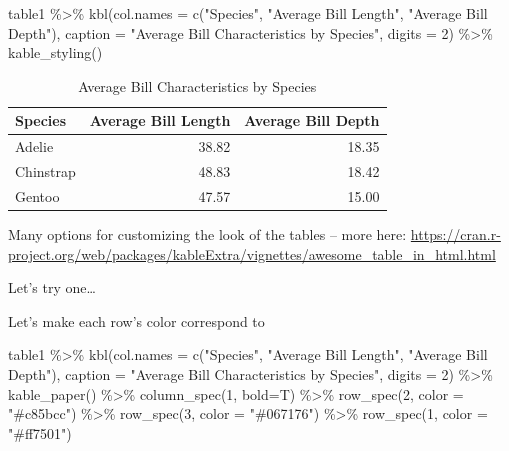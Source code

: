 \documentclass[
  letterpaper,
  DIV=11,
  numbers=noendperiod]{scrartcl}
\newenvironment{Shaded}{\begin{snugshade}}{\end{snugshade}}
\newcommand{\AttributeTok}[1]{\textcolor[rgb]{0.40,0.45,0.13}{#1}}
\newcommand{\DecValTok}[1]{\textcolor[rgb]{0.68,0.00,0.00}{#1}}
\newcommand{\FunctionTok}[1]{\textcolor[rgb]{0.28,0.35,0.67}{#1}}
\newcommand{\NormalTok}[1]{\textcolor[rgb]{0.00,0.23,0.31}{#1}}
\newcommand{\SpecialCharTok}[1]{\textcolor[rgb]{0.37,0.37,0.37}{#1}}
\newcommand{\StringTok}[1]{\textcolor[rgb]{0.13,0.47,0.30}{#1}}
\begin{document}
\begin{Shaded}
\begin{Highlighting}[]
\NormalTok{table1 }\SpecialCharTok{\%\textgreater{}\%}
  \FunctionTok{kbl}\NormalTok{(}\AttributeTok{col.names =} \FunctionTok{c}\NormalTok{(}\StringTok{"Species"}\NormalTok{, }\StringTok{"Average Bill Length"}\NormalTok{, }\StringTok{"Average Bill Depth"}\NormalTok{), }
    \AttributeTok{caption =} \StringTok{"Average Bill Characteristics by Species"}\NormalTok{, }
    \AttributeTok{digits =} \DecValTok{2}\NormalTok{) }\SpecialCharTok{\%\textgreater{}\%}
  \FunctionTok{kable\_styling}\NormalTok{()}
\end{Highlighting}
\end{Shaded}

\begin{table}
\centering
\caption{Average Bill Characteristics by Species}
\centering
\begin{tabular}[t]{l|r|r}
\hline
Species & Average Bill Length & Average Bill Depth\\
\hline
Adelie & 38.82 & 18.35\\
\hline
Chinstrap & 48.83 & 18.42\\
\hline
Gentoo & 47.57 & 15.00\\
\hline
\end{tabular}
\end{table}

Many options for customizing the look of the tables -- more here:
\url{https://cran.r-project.org/web/packages/kableExtra/vignettes/awesome_table_in_html.html}

Let's try one\ldots{}

Let's make each row's color correspond to

\begin{Shaded}
\begin{Highlighting}[]
\NormalTok{table1 }\SpecialCharTok{\%\textgreater{}\%}
  \FunctionTok{kbl}\NormalTok{(}\AttributeTok{col.names =} \FunctionTok{c}\NormalTok{(}\StringTok{"Species"}\NormalTok{, }\StringTok{"Average Bill Length"}\NormalTok{, }\StringTok{"Average Bill Depth"}\NormalTok{), }
    \AttributeTok{caption =} \StringTok{"Average Bill Characteristics by Species"}\NormalTok{, }
    \AttributeTok{digits =} \DecValTok{2}\NormalTok{) }\SpecialCharTok{\%\textgreater{}\%}
  \FunctionTok{kable\_paper}\NormalTok{() }\SpecialCharTok{\%\textgreater{}\%}
  \FunctionTok{column\_spec}\NormalTok{(}\DecValTok{1}\NormalTok{, }\AttributeTok{bold=}\NormalTok{T) }\SpecialCharTok{\%\textgreater{}\%}
  \FunctionTok{row\_spec}\NormalTok{(}\DecValTok{2}\NormalTok{, }\AttributeTok{color =} \StringTok{"\#c85bcc"}\NormalTok{) }\SpecialCharTok{\%\textgreater{}\%}
  \FunctionTok{row\_spec}\NormalTok{(}\DecValTok{3}\NormalTok{, }\AttributeTok{color =} \StringTok{"\#067176"}\NormalTok{) }\SpecialCharTok{\%\textgreater{}\%}
  \FunctionTok{row\_spec}\NormalTok{(}\DecValTok{1}\NormalTok{, }\AttributeTok{color =} \StringTok{"\#ff7501"}\NormalTok{)}
\end{Highlighting}
\end{Shaded}
\end{document}
